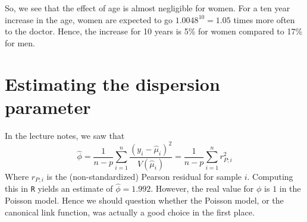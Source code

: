 \documentclass[a4paper,11pt]{article}
\begin{document}
So, we see that the effect of age is almost negligible for women. For a ten year increase in the age, women are expected to go $1.0048^10 = 1.05$ times more often to the doctor. Hence, the increase for 10 years is 5\% for women compared to 17\% for men.

\section{Estimating the dispersion parameter}
In the lecture notes, we saw that 
\begin{equation}
\widehat{\phi} = \frac{1}{n-p} \sum_{i=1}^n \frac{(y_i- \hat{\mu}_i)^2}{V(\hat{\mu}_i)} = \frac{1}{n-p} \sum_{i=1}^n r_{P;i}^2
\end{equation}
Where $r_{P;i}$ is the (non-standardized) Pearson residual for sample $i$. Computing this in \texttt{R} yields an estimate of $\hat{\phi} = 1.992$. However, the real value for $\phi$ is $1$ in the Poisson model. Hence we should question whether the Poisson model, or the canonical link function, was actually a good choice in the first place.  

\end{document}
